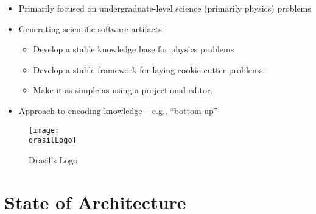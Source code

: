 \begin{itemize}

      \item Primarily focused on undergraduate-level science (primarily physics)
            problems

      \item Generating scientific software artifacts
            \begin{itemize}
                  \item Develop a stable knowledge base for physics problems

                  \item Develop a stable framework for laying cookie-cutter
                        problems.

                  \item Make it as simple as using a projectional editor.

            \end{itemize}

      \item Approach to encoding knowledge -- e.g., ``bottom-up''

\end{itemize}

\begin{figure}
	\centering
	\caption{Drasil's Logo}
	\label{fig:drasilLogo}
      \texttt{[image: \\drasilLogo]}
\end{figure}

\section{State of Architecture}

